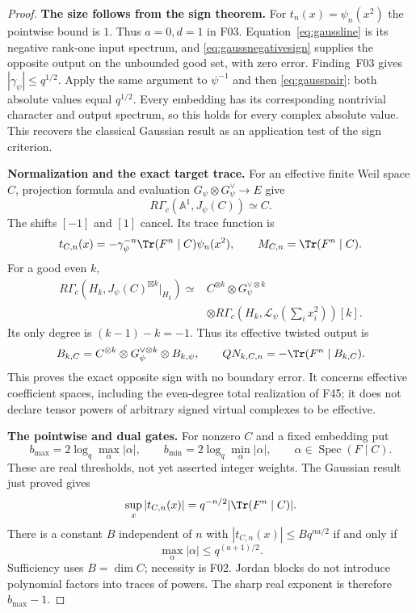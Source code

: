 \documentclass[11pt,a4paper]{article}
\newcommand{\A}{\mathbb A}\newcommand{\PP}{\mathbb P}\newcommand{\GL}{\mathrm{GL}}
\newcommand{\fid}[1]{\textsf{#1}}\newcommand{\gate}[1]{\textsf{#1}}
\theoremstyle{named}\newtheorem{finding}{Finding}[section]
\theoremstyle{definition}\newtheorem{definition}[finding]{Definition}
\theoremstyle{remark}\newtheorem{remark}[finding]{Remark}
\begin{document}
\begin{proof}
\par\smallskip\noindent\textbf{The size follows from the sign theorem.}\quad
For $t_n(x)=\psi_n(x^2)$ the pointwise bound is $1$.
Thus $a=0,d=1$ in \fid{F03}.
Equation~\eqref{eq:gaussline} is its negative rank-one
input spectrum, and \eqref{eq:gaussnegativesign} supplies
the opposite output on the unbounded good set, with zero
error. Finding~\fid{F03} gives $|\gamma_\psi|\le q^{1/2}$.
Apply the same argument to $\psi^{-1}$ and then
\eqref{eq:gausspair}: both absolute values equal $q^{1/2}$.
Every embedding has its corresponding nontrivial character
and output spectrum, so this holds for every complex
absolute value. This recovers the classical Gaussian
result as an application test of the sign criterion.

\par\smallskip\noindent\textbf{Normalization and the exact target trace.}\quad
For an effective finite Weil space $C$, projection formula
and evaluation $G_\psi\otimes G_\psi^\vee\to E$ give
\[
 R\Gamma_c(\A^1,J_\psi(C))\simeq C.
\]
The shifts $[-1]$ and $[1]$ cancel. Its trace function is
\begin{equation}\label{eq:gaussnormalizedtrace}
 t_{C,n}(x)=-\gamma_\psi^{-n}
            \Tr(F^n\mid C)\psi_n(x^2),
 \qquad M_{C,n}=\Tr(F^n\mid C).
\end{equation}
For a good even $k$,
\begin{align*}
 R\Gamma_c(H_k,J_\psi(C)^{\boxtimes k}|_{H_k})
 \simeq{}&C^{\otimes k}\otimes G_\psi^{\vee\otimes k}\\
 &\otimes
 R\Gamma_c(H_k,\mathcal L_\psi(\textstyle\sum_i x_i^2))[k].
\end{align*}
Its only degree is $(k-1)-k=-1$. Thus its effective
twisted output is
\[
 B_{k,C}=C^{\otimes k}\otimes
                    G_\psi^{\vee\otimes k}\otimes B_{k,\psi},
 \qquad
 QN_{k,C,n}=-\Tr(F^n\mid B_{k,C}).
\]
This proves the exact opposite sign with no boundary error.
It concerns effective coefficient spaces, including the
even-degree total realization of \fid{F45}; it does not
declare tensor powers of arbitrary signed virtual complexes
to be effective.

\par\smallskip\noindent\textbf{The pointwise and dual gates.}\quad
For nonzero $C$ and a fixed embedding put
\[
 b_{\max}=2\log_q\max_\alpha|\alpha|,\qquad
 b_{\min}=2\log_q\min_\alpha|\alpha|,
 \qquad \alpha\in\operatorname{Spec}(F\mid C).
\]
These are real thresholds, not yet asserted integer weights.
The Gaussian result just proved gives
\[
 \sup_x|t_{C,n}(x)|
       =q^{-n/2}|\Tr(F^n\mid C)|.
\]
There is a constant $B$ independent of $n$ with
$|t_{C,n}(x)|\le Bq^{na/2}$ if and only if
\begin{equation}\label{eq:gausspointwisegate}
 \max_\alpha|\alpha|\le q^{(a+1)/2}.
\end{equation}
Sufficiency uses $B=\dim C$; necessity is \fid{F02}.
Jordan blocks do not introduce polynomial factors into
traces of powers. The sharp real exponent is therefore
$b_{\max}-1$.


\end{proof}
\end{document}
